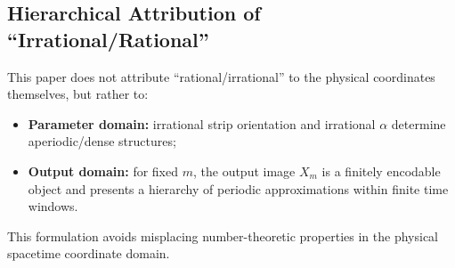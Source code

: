 \subsection{Hierarchical Attribution of ``Irrational/Rational''}

This paper does not attribute ``rational/irrational'' to the physical coordinates themselves, but rather to:
\begin{itemize}
  \item \textbf{Parameter domain:} irrational strip orientation and irrational $\alpha$ determine aperiodic/dense structures;
  \item \textbf{Output domain:} for fixed $m$, the output image $X_m$ is a finitely encodable object and presents a hierarchy of periodic approximations within finite time windows.
\end{itemize}
This formulation avoids misplacing number-theoretic properties in the physical spacetime coordinate domain.
